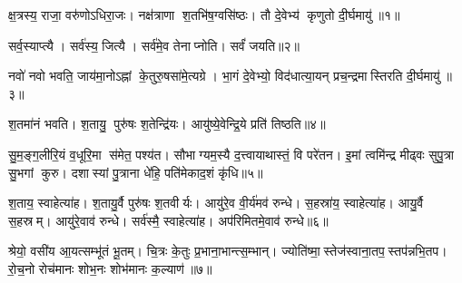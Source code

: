 
क्ष॒त्रस्य॒ राजा॒ वरु॑णोऽधिरा॒जः। नक्ष॑त्राणा श॒तभि॑ष॒ग्वसि॑ष्ठः। तौ दे॒वेभ्य॑ कृणुतो दी॒र्घमायु॑॥१॥

सर्व॒स्याप्त्यै। सर्व॑स्य॒ जित्यै। सर्व॑मे॒व तेनाप्नोति। सर्वं॑ जयति॥२॥

नवो॑ नवो भवति॒ जाय॑मा॒नोऽह्नां के॒तुरु॒षसा॑मे॒त्यग्रे।
भा॒गं दे॒वेभ्यो॒ विद॑धात्या॒यन् प्रच॒न्द्रमास्तिरति दी॒र्घमायु॑॥३॥

श॒तमा॑नं भवति। श॒तायु॒ पुरु॑षः श॒तेन्द्रि॑यः। आयु॑ष्ये॒वेन्द्रि॒ये प्रति॑ तिष्ठति॥४॥

सु॒म॒ङ्ग॒लीरि॒यं व॒धूरि॒मा स॑मेत॒ पश्य॑त। 
सौभाग्यम॒स्यै द॒त्त्वायाथास्तं॒ वि परे॑तन। 
इ॒मां त्वमि॑न्द्र मीढ्वः सुपु॒त्रा सु॒भगां कुरु। 
दशास्यां पु॒त्राना धे॑हि॒ पति॑मेकाद॒शं कृ॑धि॥५॥ 


श॒ताय॒ स्वाहेत्या॑ह। श॒तायु॒र्वै पुरु॑षः श॒तवीर्यः। आयु॑रे॒व वी॒र्य॑मव॑ रुन्धे। स॒हस्रा॑य॒ स्वाहेत्या॑ह। आयु॒र्वै स॒हस्रम्। आयु॑रे॒वाव॑ रुन्धे। सर्व॑स्मै॒ स्वाहेत्या॑ह। अप॑रिमितमे॒वाव॑ रुन्धे॥६॥


श्रेयो॒ वसी॑य आ॒यत्सम्भू॑तं भू॒तम्। 
चि॒त्रः के॒तुः प्र॒भाना॒भान्त्स॒म्भान्। 
ज्योति॑ष्मा॒स्तेज॑स्वाना॒तप॒स्तप॑न्नभि॒\-तप\sn{}। 
रो॒च॒नो रोच॑मानः शोभ॒नः शोभ॑मानः क॒ल्याण॑॥७॥

